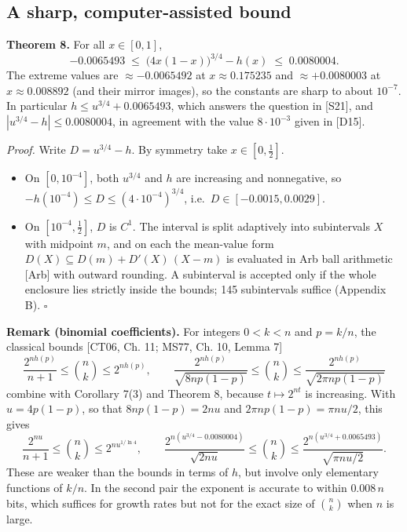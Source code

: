 \documentclass[
  11pt,
]{article}
\providecommand{\tightlist}{%
  \setlength{\itemsep}{0pt}\setlength{\parskip}{0pt}}
\begin{document}
\hypertarget{a-sharp-computer-assisted-bound}{%
\subsection{A sharp, computer-assisted
bound}\label{a-sharp-computer-assisted-bound}}

\textbf{Theorem 8.} For all \(x \in [0,1]\), \[
-0.0065493 \;\le\; \bigl(4x(1-x)\bigr)^{3/4} - h(x) \;\le\; 0.0080004 .
\] The extreme values are \(\approx -0.0065492\) at
\(x \approx 0.175235\) and \(\approx +0.0080003\) at
\(x \approx 0.008892\) (and their mirror images), so the constants are
sharp to about \(10^{-7}\). In particular \(h \le u^{3/4} + 0.0065493\),
which answers the question in {[}S21{]}, and
\(|u^{3/4} - h| \le 0.0080004\), in agreement with the value
\(8\cdot10^{-3}\) given in {[}D15{]}.

\emph{Proof.} Write \(D = u^{3/4} - h\). By symmetry take
\(x \in [0,\tfrac12]\).

\begin{itemize}
\tightlist
\item
  On \([0, 10^{-4}]\), both \(u^{3/4}\) and \(h\) are increasing and
  nonnegative, so \(-h(10^{-4}) \le D \le (4\cdot 10^{-4})^{3/4}\),
  i.e.~\(D \in [-0.0015, 0.0029]\).
\item
  On \([10^{-4}, \tfrac12]\), \(D\) is \(C^1\). The interval is split
  adaptively into subintervals \(X\) with midpoint \(m\), and on each
  the mean-value form \(D(X) \subseteq D(m) + D'(X)\,(X - m)\) is
  evaluated in Arb ball arithmetic {[}Arb{]} with outward rounding. A
  subinterval is accepted only if the whole enclosure lies strictly
  inside the bounds; 145 subintervals suffice (Appendix B). \(\square\)
\end{itemize}

\textbf{Remark (binomial coefficients).} For integers \(0 < k < n\) and
\(p = k/n\), the classical bounds {[}CT06, Ch. 11; MS77, Ch. 10, Lemma
7{]} \[
\frac{2^{n h(p)}}{n+1} \le \binom{n}{k} \le 2^{n h(p)}, \qquad \frac{2^{n h(p)}}{\sqrt{8np(1-p)}} \le \binom{n}{k} \le \frac{2^{n h(p)}}{\sqrt{2\pi np(1-p)}}
\] combine with Corollary 7(3) and Theorem 8, because
\(t \mapsto 2^{nt}\) is increasing. With \(u = 4p(1-p)\), so that
\(8np(1-p) = 2nu\) and \(2\pi np(1-p) = \pi n u/2\), this gives \[
\frac{2^{nu}}{n+1} \le \binom{n}{k} \le 2^{n u^{1/\ln 4}}, \qquad \frac{2^{n(u^{3/4} - 0.0080004)}}{\sqrt{2nu}} \le \binom{n}{k} \le \frac{2^{n(u^{3/4} + 0.0065493)}}{\sqrt{\pi n u/2}} .
\] These are weaker than the bounds in terms of \(h\), but involve only
elementary functions of \(k/n\). In the second pair the exponent is
accurate to within \(0.008\,n\) bits, which suffices for growth rates
but not for the exact size of \(\binom{n}{k}\) when \(n\) is large.
\end{document}
